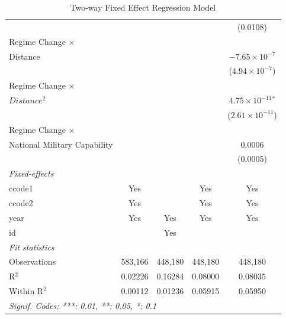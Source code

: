 \documentclass[12pt,a4paper]{article}
\begin{document}
\begin{table}[hptb]
\begin{tabular}{lcccc}
                                         &                &                         &                                & (0.0108)\\   
   Regime Change $\times$ \\Distance          &                &                         &                                & $-7.65\times 10^{-7}$\\    
                                         &                &                         &                                & ($4.94\times 10^{-7}$)\\    
   Regime Change $\times$ \\$Distance^2$    &                &                         &                                & $4.75\times 10^{-11}$$^{*}$\\    
                                         &                &                         &                                & ($2.61\times 10^{-11}$)\\    
   Regime Change $\times$ \\National Military Capability         &                &                         &                                & 0.0006\\   
                                         &                &                         &                                & (0.0005)\\   
   \midrule
   \emph{Fixed-effects}\\
   ccode1                                & Yes            &                         & Yes                            & Yes\\  
   ccode2                                & Yes            &                         & Yes                            & Yes\\  
   year                                  & Yes            & Yes                     & Yes                            & Yes\\  
   id                                    &                & Yes                     &                                & \\  
   \midrule
   \emph{Fit statistics}\\
   Observations                          & 583,166        & 448,180                 & 448,180                        & 448,180\\  
   R$^2$                                 & 0.02226        & 0.16284                 & 0.08000                        & 0.08035\\  
   Within R$^2$                          & 0.00112        & 0.01236                 & 0.05915                        & 0.05950\\  
   \midrule \midrule
   \multicolumn{5}{l}{\emph{Signif. Codes: ***: 0.01, **: 0.05, *: 0.1}}\\
\end{tabular}
    \caption{Two-way Fixed Effect Regression Model}
    \label{twfe}
\end{table}
\end{document}

